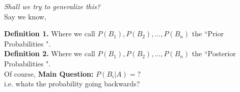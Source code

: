 \documentclass[12pt]{book}
\begin{document}
\noindent \textit{Shall we try to generalize this? }\\
\noindent Say we know, \\
\begin{center}
\end{center}

\noindent \textbf{Definition 1. } Where we call $P(B_1),P(B_2),...,P(B_n)$ the ``Prior Probabilities ".\\
\textbf{Definition 2. } Where we call $P(B_1),P(B_2),...,P(B_n)$ the ``Posterior Probabilities ".\\

\noindent Of course, \textbf{Main Question: } $P(B_i | A)=?$\\
i.e. whats the probability going backwards? \\
\end{document}
